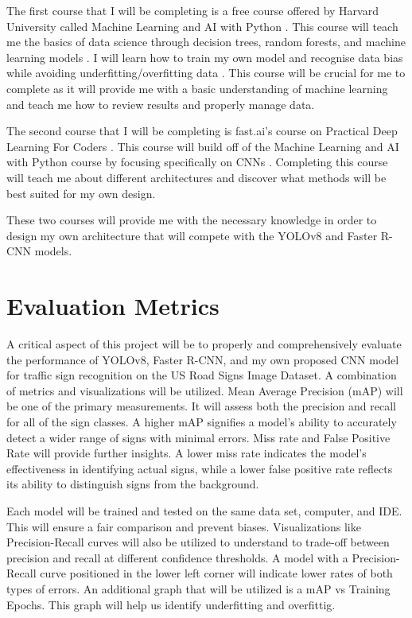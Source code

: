 \documentclass[10pt,twocolumn]{article}
\begin{document}
The first course that I will be completing is a free course offered by Harvard University called Machine Learning and AI with Python \textcite{harv}. This course will teach me the basics of data science through decision trees, random forests, and machine learning models \textcite{harv}. I will learn how to train my own model and recognise data bias while avoiding underfitting/overfitting data \textcite{harv}. This course will be crucial for me to complete as it will provide me with a basic understanding of machine learning and teach me how to review results and properly manage data. 

The second course that I will be completing is fast.ai's course on Practical Deep Learning For Coders \textcite{fast}. This course will build off of the Machine Learning and AI with Python course by focusing specifically on CNNs \textcite{fast}. Completing this course will teach me about different architectures and discover what methods will be best suited for my own design. 

These two courses will provide me with the necessary knowledge in order to design my own architecture that will compete with the YOLOv8 and Faster R-CNN models. 

\section{Evaluation Metrics}
A critical aspect of this project will be to properly and comprehensively evaluate the performance of YOLOv8, Faster R-CNN, and my own proposed CNN model for traffic sign recognition on the US Road Signs Image Dataset. A combination of metrics and visualizations will be utilized. Mean Average Precision (mAP) will be one of the primary measurements. It will assess both the precision and recall for all of the sign classes. A higher mAP signifies a model's ability to accurately detect a wider range of signs with minimal errors. Miss rate and False Positive Rate will provide further insights. A lower miss rate indicates the model's effectiveness in identifying actual signs, while a lower false positive rate reflects its ability to distinguish signs from the background. 

Each model will be trained and tested on the same data set, computer, and IDE. This will ensure a fair comparison and prevent biases. Visualizations like Precision-Recall curves will also be utilized to understand to trade-off between precision and recall at different confidence thresholds. A model with a Precision-Recall curve positioned in the lower left corner will indicate lower rates of both types of errors. An additional graph that will be utilized is a mAP vs Training Epochs. This graph will help us identify underfitting and overfittig. 
\end{document}
